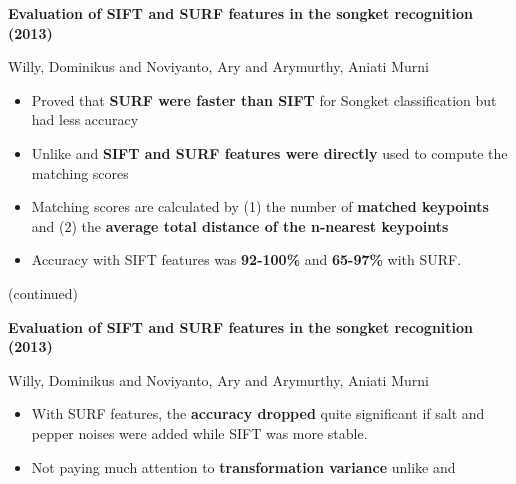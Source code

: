 \documentclass[10pt]{beamer}
\begin{document}
\begin{frame}{\cite{willy2013evaluation}}

	\textbf{Evaluation of SIFT and SURF features in the songket recognition (2013)}
	
	{\small Willy, Dominikus and Noviyanto, Ary and Arymurthy, Aniati Murni}
	
	\begin{itemize}[<+->]
		
		\item Proved that \textbf{SURF were faster than SIFT} for Songket classification but had less accuracy
		
		\item Unlike \cite{moertini2005algorithms} and \cite{azhar2015batik} \textbf{SIFT and SURF features were directly} used to compute the matching scores
		
		\item Matching scores are calculated by (1) the number of \textbf{matched keypoints} and (2) the \textbf{average total distance of the n-nearest keypoints}
		
		\item Accuracy with SIFT features was \textbf{92-100\%} and \textbf{65-97\%} with SURF. 
		
	\end{itemize}
	
\end{frame}

\begin{frame}{\cite{willy2013evaluation} (continued)}

	\textbf{Evaluation of SIFT and SURF features in the songket recognition (2013)}
	
	{\small Willy, Dominikus and Noviyanto, Ary and Arymurthy, Aniati Murni}
	
	\begin{itemize}[<+->]
		
		\item With SURF features, the \textbf{accuracy dropped} quite significant if salt and pepper noises were added while SIFT was more stable. 
		
		\item Not paying much attention to \textbf{transformation variance} unlike \cite{azhar2015batik} and \cite{nurhaida2015automatic}
		
	\end{itemize}
	
\end{frame}
\end{document}

